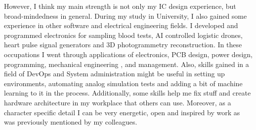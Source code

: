\documentclass[12pt,a4paper,roman]{moderncv}        %
\begin{document}
However, I think my main strength is not only my IC design experience, but broad-mindedness in general. During my study in University, I also gained some experience in other software and electrical engineering fields. I developed and programmed electronics for sampling blood tests, AI controlled logistic drones, heart pulse signal generators and 3D photogrammetry reconstruction. In these occupations  I went through applications of electronics, PCB design, power design, programming, mechanical engineering , and management. Also, skills gained in a field of DevOps and System administration might be useful in setting up environments, automating analog simulation tests and adding a bit of machine learning to it in the process. Additionally, some skills help me fix stuff and create hardware architecture in my workplace that others can use. 
Moreover, as a character specific detail I can be very energetic, open and inspired by work as was previously mentioned by my colleagues.





\vspace{0.1cm}


\makeletterclosing
\end{document}
